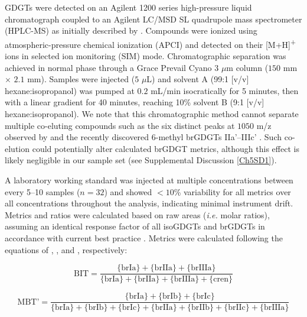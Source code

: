 GDGTs were detected on an Agilent 1200 series high-pressure liquid chromatograph coupled to an Agilent LC/MSD SL quadrupole mass spectrometer (HPLC-MS) as initially described by \citet{Hopmans:2000ti}. Compounds were ionized using atmospheric-pressure chemical ionization (APCI) and detected on their [M+H]\textsuperscript{+} ions in selected ion monitoring (SIM) mode. Chromatographic separation was achieved in normal phase through a Grace Prevail Cyano $3$ $\mu$m column ($150$ mm $\times$ $2.1$ mm). Samples were injected ($5$ $\mu$L) and solvent A (99:1 [v/v] hexane:isopropanol) was pumped at $0.2$ mL/min isocratically for 5 minutes, then with a linear gradient for 40 minutes, reaching 10\% solvent B (9:1 [v/v] hexane:isopropanol). We note that this chromatographic method cannot separate multiple co-eluting compounds such as the six distinct peaks at $1050$ m/z observed by \citet{Becker:2013jw} and the recently discovered 6-methyl brGDGTs IIa'--IIIc' \citep[see Figure \ref{Ch5Fig:S1} for structures;][]{DeJonge:2013cr,DeJonge:2014kw}. Such co-elution could potentially alter calculated brGDGT metrics, although this effect is likely negligible in our sample set (see Supplemental Discussion \ref{Ch5SD1}).

A laboratory working standard was injected at multiple concentrations between every 5--10 samples ($n = 32$) and showed $<10$\% variability for all metrics over all concentrations throughout the analysis, indicating minimal instrument drift. Metrics and ratios were calculated based on raw areas (\textit{i.e.} molar ratios), assuming an identical response factor of all isoGDGTs and brGDGTs in accordance with current best practice \citep{Schouten:2013hh,Schouten:2013bd}. Metrics were calculated following the equations of \citet{Hopmans:2004kx}, \citet{Peterse:2012bs}, and \citet{Weijers:2007gu}, respectively:

\begin{equation}\label{Ch5Eq:1}
	\text{BIT} = \frac{\{\text{brIa}\} + \{\text{brIIa}\} + \{\text{brIIIa}\}}{\{\text{brIa}\} + \{\text{brIIa}\} + \{\text{brIIIa}\} + \{\text{cren}\}}
\end{equation}

\begin{equation}\label{Ch5Eq:2}
	\text{MBT'} = \frac{\{\text{brIa}\} + \{\text{brIb}\} + \{\text{brIc}\}}{\{\text{brIa}\} + \{\text{brIb}\} + \{\text{brIc}\} + \{\text{brIIa}\} + \{\text{brIIb}\} + \{\text{brIIc}\} + \{\text{brIIIa}\}}
\end{equation}

